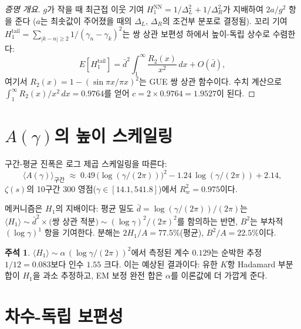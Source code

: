 \documentclass[11pt,a4paper]{article}
\theoremstyle{plain}
\theoremstyle{definition}
\newtheorem{remark}[theorem]{주석}
\begin{document}
\begin{proof}[증명 개요]
$g$가 작을 때 최근접 이웃 기여 $H_1^{\mathrm{NN}} =
1/\Delta_L^2 + 1/\Delta_R^2$가 지배하여 $2a/g^2$ 항을 준다
($a$는 최솟값이 주어졌을 때의 $\Delta_L$, $\Delta_R$의 조건부 분포로 결정됨).
꼬리 기여 $H_1^{\mathrm{tail}} =
\sum_{|k-n| \ge 2} 1/(\gamma_n - \gamma_k)^2$는
쌍 상관 보편성 하에서 높이-독립 상수로 수렴한다:
\[
  E[H_1^{\mathrm{tail}}] = \bar{d}^2 \int_1^\infty
  \frac{R_2(x)}{x^2}\,dx + O(\bar{d}),
\]
여기서 $R_2(x) = 1 - (\sin\pi x/\pi x)^2$는 GUE 쌍 상관 함수이다.
수치 계산으로 $\int_1^\infty R_2(x)/x^2\,dx = 0.9764$를 얻어
$c = 2 \times 0.9764 = 1.9527$이 된다.
\end{proof}


\section{$A(\gamma)$의 높이 스케일링}
\label{sec:height}

구간-평균 진폭은 로그 제곱 스케일링을 따른다:
\begin{equation}\label{eq:height_scaling}
  \langle A(\gamma) \rangle_{\mathrm{구간}}
  \;\approx\; 0.49\,\bigl(\log(\gamma/(2\pi))\bigr)^2
  - 1.24\,\log(\gamma/(2\pi)) + 2.14,
\end{equation}
$\zeta(s)$의 10구간 300 영점($\gamma \in [14.1, 541.8]$)에서
$R^2_w = 0.975$이다.

메커니즘은 $H_1$의 지배이다: 평균 밀도
$\bar{d} = \log(\gamma/(2\pi))/(2\pi)$는
$\langle H_1 \rangle \sim \bar{d}^2 \times \text{(쌍 상관 적분)}
\sim (\log\gamma)^2/(2\pi)^2$를 함의하는 반면,
$B^2$는 부차적 $(\log\gamma)^1$ 항을 기여한다.
분해는 $2H_1/A = 77.5\%$(평균), $B^2/A = 22.5\%$이다.

\begin{remark}
$\langle H_1\rangle \sim \alpha\,(\log\gamma/(2\pi))^2$에서 측정된
계수 $0.129$는 순박한 추정 $1/12 = 0.083$보다 인수 $1.55$ 크다.
이는 예상된 결과이다: 유한 $K$항 Hadamard 부분 합이
$H_1$을 과소 추정하고, EM 보정 완전 합은 $\alpha$를 이론값에 더 가깝게 준다.
\end{remark}


\section{차수-독립 보편성}
\label{sec:universality}
\end{document}
